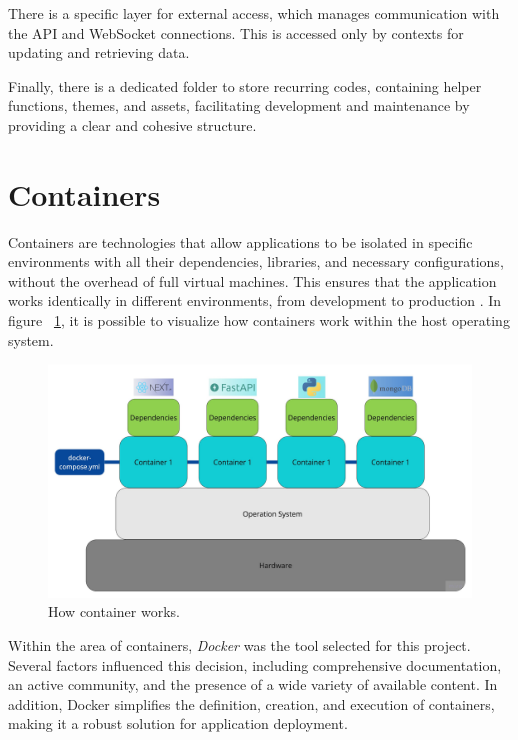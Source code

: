 There is a specific layer for external access, which manages communication with the \gls{API} and WebSocket connections. This is accessed only by contexts for updating and retrieving data.

Finally, there is a dedicated folder to store recurring codes, containing helper functions, themes, and assets, facilitating development and maintenance by providing a clear and cohesive structure.


\section{Containers}
Containers are technologies that allow applications to be isolated in specific environments with all their dependencies, libraries, and necessary configurations, without the overhead of full virtual machines. This ensures that the application works identically in different environments, from development to production \cite{paraiso2016model}. In figure ~\ref{fig:container}, it is possible to visualize how containers work within the host operating system.

\begin{figure}[htbp]
	\centering
	\includegraphics[scale=0.12]{images/container.jpg}
	\caption{How container works.}
	\label{fig:container}
\end{figure}

Within the area of containers, \textit{Docker} \cite{dockerDocs} was the tool selected for this project. Several factors influenced this decision, including comprehensive documentation, an active community, and the presence of a wide variety of available content. In addition, Docker simplifies the definition, creation, and execution of containers, making it a robust solution for application deployment.


